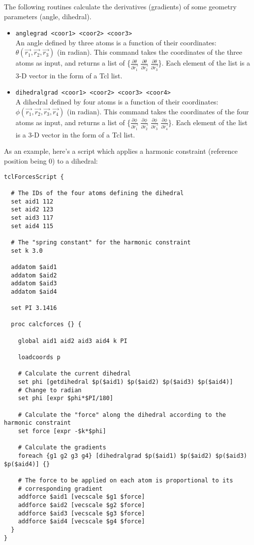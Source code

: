 The following routines calculate the derivatives (gradients) of
some geometry parameters (angle, dihedral).

\begin{itemize}

\item
{\tt anglegrad <coor1> <coor2> <coor3>} \\
An angle defined by three atoms is a function of their
coordinates:
$\theta\left(\vec{r_1},\vec{r_2},\vec{r_3}\right)$ (in radian).
This command takes the coordinates of the three atoms as input,
and returns a list of \{$\frac{\partial\theta}{\partial\vec{r_1}}$
$\frac{\partial\theta}{\partial\vec{r_2}}$
$\frac{\partial\theta}{\partial\vec{r_3}}$\}. Each element of the
list is a 3-D vector in the form of a Tcl list.

\item
{\tt dihedralgrad <coor1> <coor2> <coor3> <coor4>} \\
A dihedral defined by four atoms is a function of their
coordinates:
$\phi\left(\vec{r_1},\vec{r_2},\vec{r_3},\vec{r_4}\right)$ (in
radian). This command takes the coordinates of the four atoms as
input, and returns a list of
\{$\frac{\partial\phi}{\partial\vec{r_1}}$
$\frac{\partial\phi}{\partial\vec{r_2}}$
$\frac{\partial\phi}{\partial\vec{r_3}}$
$\frac{\partial\phi}{\partial\vec{r_4}}$\}. Each element of the
list is a 3-D vector in the form of a Tcl list.

\end{itemize}

As an example, here's a script which applies a harmonic
constraint (reference position being 0) to a dihedral:

\begin{verbatim}
tclForcesScript {

  # The IDs of the four atoms defining the dihedral
  set aid1 112
  set aid2 123
  set aid3 117
  set aid4 115
  
  # The "spring constant" for the harmonic constraint
  set k 3.0
  
  addatom $aid1
  addatom $aid2
  addatom $aid3
  addatom $aid4
  
  set PI 3.1416
  
  proc calcforces {} {
  
    global aid1 aid2 aid3 aid4 k PI
    
    loadcoords p
    
    # Calculate the current dihedral
    set phi [getdihedral $p($aid1) $p($aid2) $p($aid3) $p($aid4)]
    # Change to radian
    set phi [expr $phi*$PI/180]
    
    # Calculate the "force" along the dihedral according to the harmonic constraint
    set force [expr -$k*$phi]
    
    # Calculate the gradients
    foreach {g1 g2 g3 g4} [dihedralgrad $p($aid1) $p($aid2) $p($aid3) $p($aid4)] {}
    
    # The force to be applied on each atom is proportional to its
    # corresponding gradient
    addforce $aid1 [vecscale $g1 $force]
    addforce $aid2 [vecscale $g2 $force]
    addforce $aid3 [vecscale $g3 $force]
    addforce $aid4 [vecscale $g4 $force]
  }
}
\end{verbatim}

